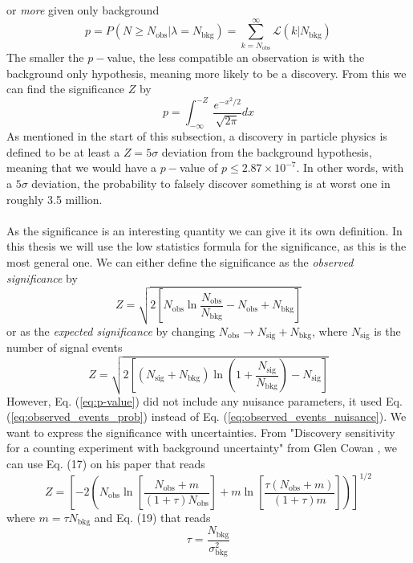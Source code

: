 \documentclass[12pt, a4paper]{book}
\begin{document}
or \textit{more} given only background
\begin{equation}\label{eq:p-value}
    p = P(N\ge N_{\text{obs}}\vert \lambda = N_{\text{bkg}}) = \sum_{k=N_{\text{obs}}}^{\infty}\mathcal{L}(k\vert N_{\text{bkg}})
\end{equation}
The smaller the $p-$value, the less compatible an observation is with the background only hypothesis, meaning more likely to be a discovery. From this we can find the significance $Z$ by
$$
    p = \int_{-\infty}^{-Z} \frac{e^{-x^2/2}}{\sqrt{2\pi}}dx
$$
As mentioned in the start of this subsection, a discovery in particle physics is defined to be at least a $Z=5\sigma$ deviation from the background hypothesis, meaning that we would have a $p-$value of $p\le2.87\times10^{-7}$. In other words, with a $5\sigma$ deviation, the probability to 
falsely discover something is at worst one in roughly 3.5 million.\\ 
\\As the significance is an interesting quantity we can give it its own definition. In this thesis we will use the low statistics formula for the significance, as this is the most general one. We can either define the significance as the \textit{observed significance} by
\begin{equation}\label{eq:obs_sig}
    Z = \sqrt{2\left[N_{\text{obs}}\ln\frac{N_{\text{obs}}}{N_{\text{bkg}}}-N_{\text{obs}}+N_{\text{bkg}}\right]}
\end{equation}
or as the \textit{expected significance} by changing $N_{\text{obs}} \rightarrow N_{\text{sig}}+N_{\text{bkg}}$, where $N_{\text{sig}}$ is the number of signal events
\begin{equation}\label{eq:exp_sig}
    Z = \sqrt{2\left[(N_{\text{sig}}+N_{\text{bkg}})\ln\left(1+\frac{N_{\text{sig}}}{N_{\text{bkg}}}\right)-N_{\text{sig}}\right]}
\end{equation}
However, Eq. (\ref{eq:p-value}) did not include any nuisance parameters, it used Eq. (\ref{eq:observed_events_prob}) instead of Eq. (\ref{eq:observed_events_nuisance}). We want to express the significance with uncertainties. From "Discovery sensitivity for a counting experiment with background uncertainty" from Glen Cowan
\cite{Cowan_Uncertainty_in_sig}, we can use Eq. (17) on his paper that reads
$$
Z = \left[-2\left(N_{\text{obs}}\ln\left[\frac{N_{\text{obs}}+m}{(1+\tau)N_{\text{obs}}}\right] + m\ln\left[\frac{\tau(N_{\text{obs}}+m)}{(1+\tau)m}\right]\right)\right]^{1/2}
$$
where $m=\tau N_{\text{bkg}}$ and Eq. (19) that reads
$$
\tau=\frac{N_{\text{bkg}}}{\sigma_{\text{bkg}}^2}
$$
\end{document}

